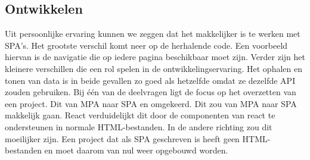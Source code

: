 \documentclass{hogent-article}
\begin{document}
\subsection{Ontwikkelen}
Uit persoonlijke ervaring kunnen we zeggen dat het makkelijker is te werken met SPA's.
Het grootste verschil komt neer op de herhalende code.
Een voorbeeld hiervan is de navigatie die op iedere pagina beschikbaar moet zijn.
Verder zijn het kleinere verschillen die een rol spelen in de ontwikkelingservaring.
Het ophalen en tonen van data is in beide gevallen zo goed als hetzelfde omdat ze dezelfde API zouden gebruiken.
Bij één van de deelvragen ligt de focus op het overzetten van een project.
Dit van MPA naar SPA en omgekeerd.
Dit zou van MPA naar SPA makkelijk gaan.
React verduidelijkt dit door de componenten van react te ondersteunen in normale HTML-bestanden.
In de andere richting zou dit moeilijker zijn.
Een project dat als SPA geschreven is heeft geen HTML-bestanden en moet daarom van nul weer opgebouwd worden.

\printbibliography[heading=bibintoc]
\end{document}
